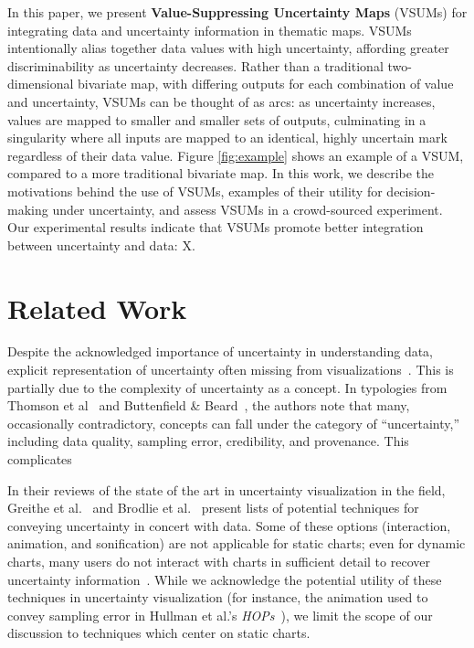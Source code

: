 \documentclass{vgtc}                          %
\begin{document}
In this paper, we present \textbf{Value-Suppressing Uncertainty Maps} (VSUMs) for integrating data and uncertainty information in thematic maps. VSUMs intentionally alias together data values with high uncertainty, affording greater discriminability as uncertainty decreases. Rather than a traditional two-dimensional bivariate map, with differing outputs for each combination of value and uncertainty, VSUMs can be thought of as arcs: as uncertainty increases, values are mapped to smaller and smaller sets of outputs, culminating in a singularity where all inputs are mapped to an identical, highly uncertain mark regardless of their data value. Figure \ref{fig:example} shows an example of a VSUM, compared to a more traditional bivariate map. In this work, we describe the motivations behind the use of VSUMs, examples of their utility for decision-making under uncertainty, and assess VSUMs in a crowd-sourced experiment. Our experimental results indicate that VSUMs promote better integration between uncertainty and data: X.

\exampleFig 
\section{Related Work}


Despite the acknowledged importance of uncertainty in understanding data, explicit representation of uncertainty often missing from visualizations~\cite{boukhelifa2009uncertainty}. This is partially due to the complexity of uncertainty as a concept. In typologies from Thomson et al~\cite{thomson2005typology} and Buttenfield \& Beard~\cite{buttenfield1994graphical}, the authors note that many, occasionally contradictory, concepts can fall under the category of ``uncertainty,'' including data quality, sampling error, credibility, and provenance. This complicates 
 
In their reviews of the state of the art in uncertainty visualization in the field, Greithe et al.~\cite{griethe2006visualization} and Brodlie et al.~\cite{brodlie2012review} present lists of potential techniques for conveying uncertainty in concert with data. Some of these options (interaction, animation, and sonification) are not applicable for static charts; even for dynamic charts, many users do not interact with charts in sufficient detail to recover uncertainty information~\cite{nyt2016}. While we acknowledge the potential utility of these techniques in uncertainty visualization (for instance, the animation used to convey sampling error in Hullman et al.'s \emph{HOPs}~\cite{hullman2015hypothetical}), we limit the scope of our discussion to techniques which center on static charts.
\end{document}

